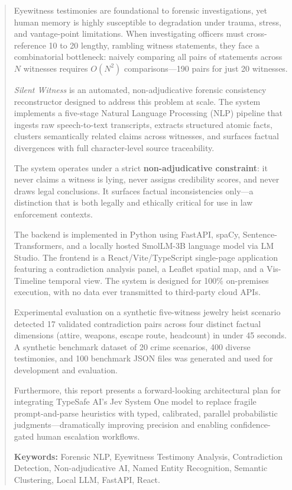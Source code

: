 \documentclass[12pt,a4paper]{report}
\begin{document}
\begin{abstract}
Eyewitness testimonies are foundational to forensic investigations, yet human memory is highly susceptible to degradation under trauma, stress, and vantage-point limitations. When investigating officers must cross-reference 10 to 20 lengthy, rambling witness statements, they face a combinatorial bottleneck: naively comparing all pairs of statements across $N$ witnesses requires $O(N^2)$ comparisons---190 pairs for just 20 witnesses.

\textit{Silent Witness} is an automated, non-adjudicative forensic consistency reconstructor designed to address this problem at scale. The system implements a five-stage Natural Language Processing (NLP) pipeline that ingests raw speech-to-text transcripts, extracts structured atomic facts, clusters semantically related claims across witnesses, and surfaces factual divergences with full character-level source traceability.

The system operates under a strict \textbf{non-adjudicative constraint}: it never claims a witness is lying, never assigns credibility scores, and never draws legal conclusions. It surfaces factual inconsistencies only---a distinction that is both legally and ethically critical for use in law enforcement contexts.

The backend is implemented in Python using FastAPI, spaCy, Sentence-Transformers, and a locally hosted SmolLM-3B language model via LM Studio. The frontend is a React/Vite/TypeScript single-page application featuring a contradiction analysis panel, a Leaflet spatial map, and a Vis-Timeline temporal view. The system is designed for 100\% on-premises execution, with no data ever transmitted to third-party cloud APIs.

Experimental evaluation on a synthetic five-witness jewelry heist scenario detected 17 validated contradiction pairs across four distinct factual dimensions (attire, weapons, escape route, headcount) in under 45 seconds. A synthetic benchmark dataset of 20 crime scenarios, 400 diverse testimonies, and 100 benchmark JSON files was generated and used for development and evaluation.

Furthermore, this report presents a forward-looking architectural plan for integrating TypeSafe AI's Jev System One model to replace fragile prompt-and-parse heuristics with typed, calibrated, parallel probabilistic judgments---dramatically improving precision and enabling confidence-gated human escalation workflows.

\textbf{Keywords:} Forensic NLP, Eyewitness Testimony Analysis, Contradiction Detection, Non-adjudicative AI, Named Entity Recognition, Semantic Clustering, Local LLM, FastAPI, React.
\end{abstract}
\end{document}
